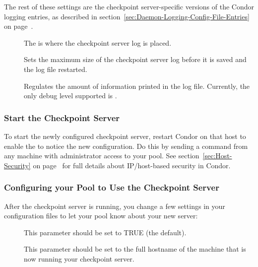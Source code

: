 The rest of these settings are the checkpoint server-specific versions
of the Condor logging entries, as described in
section~\ref{sec:Daemon-Logging-Config-File-Entries} on
page~\pageref{sec:Daemon-Logging-Config-File-Entries}.
\begin{description}

\item[] The  is where the
checkpoint server log is placed.

\item[] Sets the maximum
size of the checkpoint server log before it is saved and the
log file restarted.

\item[] Regulates
the amount of information
printed in the log file.
Currently, the only debug level supported is .

\end{description}

\subsubsection{\label{sec:Start-Ckpt-Server} 
Start the Checkpoint Server} 

To start the newly configured checkpoint server,
restart Condor on that host to enable
the  to notice the new configuration.
Do this by sending a  command from any machine
with administrator access to your pool.
See section~\ref{sec:Host-Security} on
page~\pageref{sec:Host-Security} for full details about IP/host-based
security in Condor.

\subsubsection{\label{sec:Configure-Pool-Ckpt-Server} 
Configuring your Pool to Use the Checkpoint Server}

After the checkpoint server is running, you
change a few settings in your configuration files to let your pool know
about your new server:

\begin{description}
   \item[] This parameter should be set to
   TRUE (the default).

   \item[] This parameter should be set to
   the full hostname of the machine that is now running your checkpoint
   server.  
\end{description}

